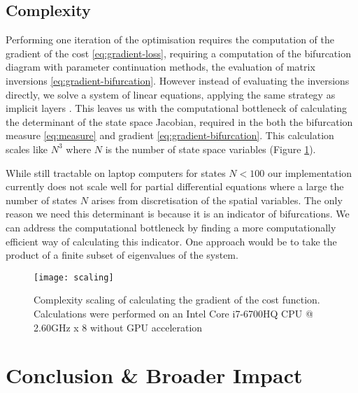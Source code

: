 \subsection{Complexity}
Performing one iteration of the optimisation requires the computation of the gradient of the cost \eqref{eq:gradient-loss}, requiring a computation of the bifurcation diagram with parameter continuation methods, the evaluation of matrix inversions \eqref{eq:gradient-bifurcation}. However instead of evaluating the inversions directly, we solve a system of linear equations, applying the same strategy as implicit layers \cite{Look2020DifferentiableLayers,Bai2019DeepModels}. This leaves us with the computational bottleneck of calculating the determinant of the state space Jacobian, required in the both the bifurcation measure \eqref{eq:measure} and gradient \eqref{eq:gradient-bifurcation}. This calculation scales like $N^3$ where $N$ is the number of state space variables (Figure \ref{fig:scaling}).

While still tractable on laptop computers for states $N<100$ our implementation currently does not scale well for partial differential equations where a large the number of states $N$ arises from discretisation of the spatial variables. The only reason we need this determinant is because it is an indicator of bifurcations. We can address the computational bottleneck by finding a more computationally efficient way of calculating this indicator. One approach would be to take the product of a finite subset of eigenvalues of the system.

\begin{figure}
\centering
\texttt{[image: scaling]}
\caption{Complexity scaling of calculating the gradient of the cost function. Calculations were performed on an Intel Core i7-6700HQ CPU @ 2.60GHz x 8 without GPU acceleration}
\label{fig:scaling}
\end{figure}
 
\section{Conclusion \& Broader Impact}

